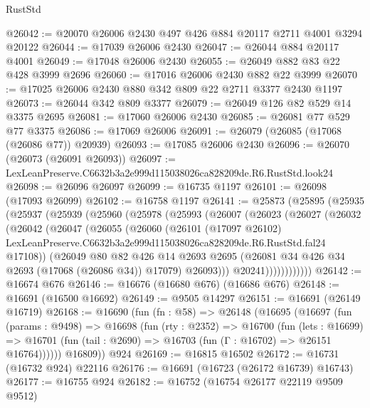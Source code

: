 \begin{lexlean}{RustStd}
\begin{coremodule}
@26042 := @20070 @26006 @2430 @497 @426 @884 @20117 @2711 @4001 @3294 @20122
@26044 := @17039 @26006 @2430
@26047 := @26044 @884 @20117 @4001
@26049 := @17048 @26006 @2430
@26055 := @26049 @882 @83 @22 @428 @3999 @2696
@26060 := @17016 @26006 @2430 @882 @22 @3999
@26070 := @17025 @26006 @2430 @880 @342 @809 @22 @2711 @3377 @2430 @1197
@26073 := @26044 @342 @809 @3377
@26079 := @26049 @126 @82 @529 @14 @3375 @2695
@26081 := @17060 @26006 @2430
@26085 := @26081 @77 @529 @77 @3375
@26086 := @17069 @26006
@26091 := @26079 (@26085 (@17068 (@26086 @77)) @20939)
@26093 := @17085 @26006 @2430
@26096 := @26070 (@26073 (@26091 @26093))
@26097 := LexLeanPreserve.C6632b3a2e999d115038026ca828209de.R6.RustStd.look24
@26098 := @26096 @26097
@26099 := @16735 @1197
@26101 := @26098 (@17093 @26099)
@26102 := @16758 @1197
@26141 := @25873
    (@25895
      (@25935
        (@25937
          (@25939
            (@25960
              (@25978
                (@25993
                  (@26007
                    (@26023
                      (@26027
                        (@26032
                          (@26042
                            (@26047
                              (@26055
                                (@26060
                                  (@26101
                                    (@17097 @26102)
                                    LexLeanPreserve.C6632b3a2e999d115038026ca828209de.R6.RustStd.fal24
                                    @17108))
                                (@26049
                                  @80
                                  @82
                                  @426
                                  @14
                                  @2693
                                  @2695
                                  (@26081 @34 @426 @34 @2693 (@17068 (@26086 @34)) @17079)
                                  @26093)))
                            @20241))))))))))))
@26142 := @16674 @676
@26146 := @16676 (@16680 @676) (@16686 @676)
@26148 := @16691 (@16500 @16692)
@26149 := @9505 @14297
@26151 := @16691 (@26149 @16719)
@26168 := @16690
    (fun (fn : @58) =>
    @26148
      (@16695
        (@16697
          (fun (params : @9498) =>
          @16698
            (fun (rty : @2352) =>
            @16700
              (fun (lets : @16699) =>
              @16701 (fun (tail : @2690) => @16703 (fun (Γ : @16702) => @26151 @16764))))))
        @16809))
    @924
@26169 := @16815 @16502
@26172 := @16731 (@16732 @924) @22116
@26176 := @16691 (@16723 (@26172 @16739) @16743)
@26177 := @16755 @924
@26182 := @16752 (@16754 @26177 @22119 @9509 @9512)

\end{coremodule}
\end{lexlean}
